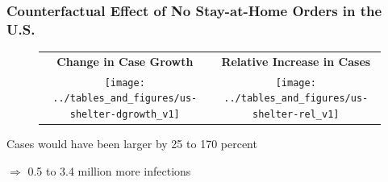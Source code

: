 \documentclass{beamer}
\begin{document}
\begin{frame}
  \frametitle{Counterfactual Effect of No Stay-at-Home Orders in the U.S.}

 
\begin{figure}[ht]
  \begin{minipage}{\linewidth}
    \centering
    \begin{tabular}{cc} 
      \textbf{Change in Case Growth} &  \textbf{Relative Increase in Cases}\\
      \texttt{[image: ../tables\_and\_figures/us-shelter-dgrowth\_v1]}
      &
        \texttt{[image: ../tables\_and\_figures/us-shelter-rel\_v1]}
    \end{tabular}
  \end{minipage}
\end{figure}

Cases would have been larger by  25 to 170 percent
 
 $\Rightarrow$  0.5 to 3.4 million more infections
 
\end{frame}
\end{document}

